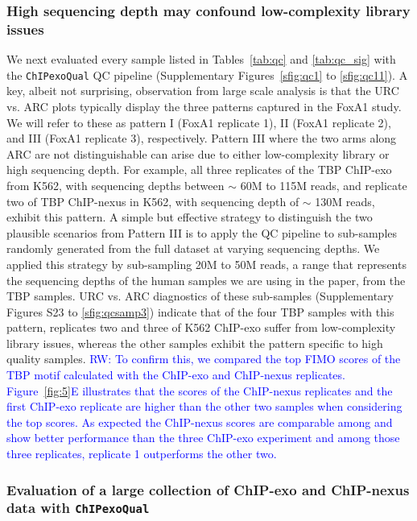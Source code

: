 \documentclass{bmcart}
\newcommand{\pname}[1]{\texttt{ChIPexoQual}}
\newcommand{\RW}[1]{\textcolor{blue}{RW: #1}}
\begin{document}
\subsubsection*{High sequencing depth may confound low-complexity library issues}

We next evaluated every sample listed in Tables~\ref{tab:qc} and
\ref{tab:qc_sig} with the \pname{} QC pipeline (Supplementary
Figures~\ref{sfig:qc1} to \ref{sfig:qc11}). A key, albeit not
surprising, observation from large scale analysis is that the URC
vs. ARC plots typically display the three patterns captured in the
FoxA1 study. We will refer to these as pattern I (FoxA1 replicate 1),
II (FoxA1 replicate 2), and III (FoxA1 replicate 3), respectively.
Pattern III where the two arms along ARC are not distinguishable can
arise due to either low-complexity library or high sequencing depth.
For example, all three replicates of the TBP ChIP-exo from K562, with
sequencing depths between $\sim$ 60M to 115M reads, and replicate two
of TBP ChIP-nexus in K562, with sequencing depth of $\sim$ 130M reads,
exhibit this pattern. A simple but effective strategy to distinguish
the two plausible scenarios from Pattern III is to apply the QC
pipeline to sub-samples randomly generated from the full dataset at
varying sequencing depths. We applied this strategy by sub-sampling
20M to 50M reads, a range that represents the sequencing depths of the
human samples we are using in the paper, from the TBP samples.  URC
vs. ARC diagnostics of these sub-samples (Supplementary Figures S23 to
\ref{sfig:qcsamp3}) indicate that of the four TBP samples with this
pattern, replicates two and three of K562 ChIP-exo suffer from
low-complexity library issues, whereas the other samples exhibit the
pattern specific to high quality samples. \RW{To confirm this, we
  compared the top FIMO scores \cite{fimo} of the TBP motif calculated
  with the ChIP-exo and ChIP-nexus replicates. Figure~\ref{fig:5}E
  illustrates that the scores of the ChIP-nexus replicates and the
  first ChIP-exo replicate are higher than the other two samples when
  considering the top scores. As expected the ChIP-nexus scores are
  comparable among and show better performance than the three ChIP-exo
  experiment and among those three replicates, replicate 1 outperforms
  the other two.}

  
\subsubsection*{Evaluation of a large collection of ChIP-exo and
  ChIP-nexus data with \pname{}}
\end{document}
